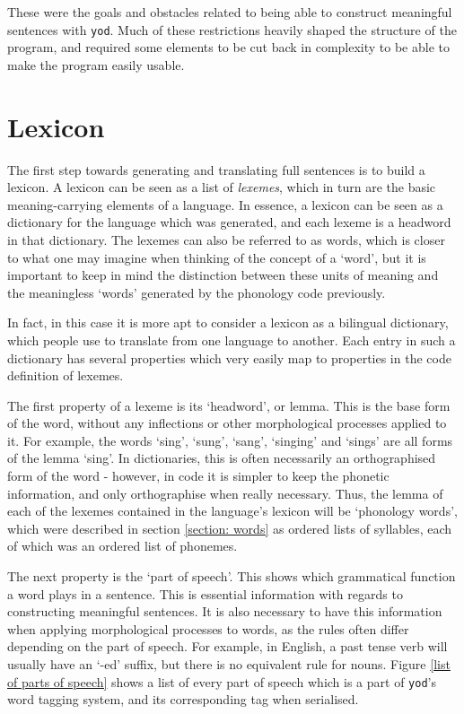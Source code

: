 \documentclass{report}
\begin{document}
	These were the goals and obstacles related to being able to construct meaningful sentences with \texttt{yod}. Much of these restrictions heavily shaped the structure of the program, and required some elements to be cut back in complexity to be able to make the program easily usable.
	
	\section{Lexicon}
	\label{section: lexicon}
	
	The first step towards generating and translating full sentences is to build a lexicon. A lexicon can be seen as a list of \textit{lexemes}, which in turn are the basic meaning-carrying elements of a language. In essence, a lexicon can be seen as a dictionary for the language which was generated, and each lexeme is a headword in that dictionary. The lexemes can also be referred to as words, which is closer to what one may imagine when thinking of the concept of a `word', but it is important to keep in mind the distinction between these units of meaning and the meaningless `words' generated by the phonology code previously. 
	
	In fact, in this case it is more apt to consider a lexicon as a bilingual dictionary, which people use to translate from one language to another. Each entry in such a dictionary has several properties which very easily map to properties in the code definition of lexemes.
	
	The first property of a lexeme is its `headword', or lemma. This is the base form of the word, without any inflections or other morphological processes applied to it. For example, the words `sing', `sung', `sang', `singing' and `sings' are all forms of the lemma `sing'. In dictionaries, this is often necessarily an orthographised form of the word - however, in code it is simpler to keep the phonetic information, and only orthographise when really necessary. Thus, the lemma of each of the lexemes contained in the language's lexicon will be `phonology words', which were described in section \ref{section: words} as ordered lists of syllables, each of which was an ordered list of phonemes.
	
	The next property is the `part of speech'. This shows which grammatical function a word plays in a sentence. This is essential information with regards to constructing meaningful sentences. It is also necessary to have this information when applying morphological processes to words, as the rules often differ depending on the part of speech. For example, in English, a past tense verb will usually have an `-ed' suffix, but there is no equivalent rule for nouns. Figure \ref{list of parts of speech} shows a list of every part of speech which is a part of \texttt{yod}'s word tagging system, and its corresponding tag when serialised.
	
\end{document}
